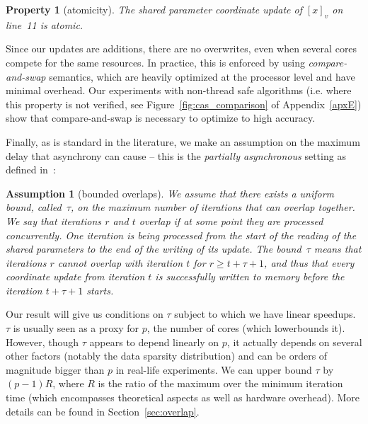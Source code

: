 \documentclass[twoside, 11pt]{article}
\newcommand{\overlap}{\tau}
\newtheorem{asm}[theorem]{Assumption}
\newtheorem{prop}[theorem]{Property}
\begin{document}
\begin{prop} [atomicity]
The shared parameter coordinate update of $[x]_v$ on line~11 is atomic.
\label{eventconst}
\end{prop}
Since our updates are additions, there are no overwrites, even when several cores compete for the same resources.
In practice, this is enforced by using \textit{compare-and-swap} semantics, which are heavily optimized at the processor level and have minimal overhead.
Our experiments with non-thread safe algorithms (i.e. where this property is not verified, see Figure~\ref{fig:cas_comparison} of Appendix~\ref{apxE}) show that compare-and-swap is necessary to optimize to high accuracy.

Finally, as is standard in the literature, we make an assumption on the maximum delay that asynchrony can cause -- this is the \emph{partially asynchronous} setting as defined in~\citet{bertsekasParalle1989}:
\begin{asm}[bounded overlaps]  \label{boundedoverlap}
We assume that there exists a uniform bound, called~$\overlap$, on the maximum number of iterations that can overlap together. We say that iterations $r$ and $t$ overlap if at some point they are processed concurrently.
One iteration is being processed from the start of the reading of the shared parameters to the end of the writing of its update.
The bound~$\overlap$ means that iterations $r$ cannot overlap with iteration $t$ for $r \geq t + \tau+1$,  and thus that every coordinate update from iteration $t$ is successfully written to memory before the iteration $t + \overlap+1$ starts.
\end{asm}
Our result will give us conditions on $\overlap$ subject to which we have linear speedups.
$\overlap$ is usually seen as a proxy for $p$, the number of cores (which lowerbounds it).
However, though $\overlap$ appears to depend linearly on $p$, it actually depends on several other factors (notably the data sparsity distribution) and can be orders of magnitude bigger than $p$ in real-life experiments.
We can upper bound $\overlap$ by $(p-1)R$, where $R$ is the ratio of the maximum over the minimum iteration time (which encompasses theoretical aspects as well as hardware overhead).
More details can be found in Section~\ref{sec:overlap}.
\end{document}
